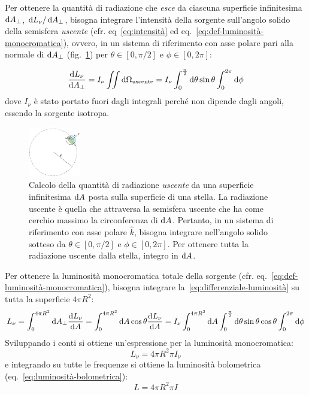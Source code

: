 Per ottenere la quantità di radiazione che \emph{esce} da ciascuna superficie infinitesima $\mathop{\mathrm{{}d}}\mathopen{} A_\perp$, $\mathop{\mathrm{{}d}}\mathopen{} L_\nu / \mathop{\mathrm{{}d}}\mathopen{} A_\perp$, bisogna integrare l'intensità della sorgente sull'angolo solido della semisfera \emph{uscente} (cfr. eq~\eqref{eq:intensità} ed eq.~\eqref{eq:def-luminosità-monocromatica}), ovvero, in un sistema di riferimento con asse polare pari alla normale di $\mathop{\mathrm{{}d}}\mathopen{} A_\perp$ (fig.~\ref{fig:emisfera-uscente}) per $\theta \in [0, \pi/2]$ e $\phi \in [0, 2\pi]$:

\begin{equation}\label{eq:differenziale-luminosità}
    \frac{\mathop{\mathrm{{}d}}\mathopen{} L_\nu}{\mathop{\mathrm{{}d}}\mathopen{} A_\perp} = I_\nu \iint \mathop{\mathrm{{}d}}\mathopen{} \Omega_\textup{uscente} = I_\nu \int_{0}^{\frac{\pi}{2}} \mathop{\mathrm{{}d}}\mathopen{} \theta \sin{\theta} \int_{0}^{2\pi} \mathop{\mathrm{{}d}}\mathopen{} \phi
\end{equation}
dove $I_\nu$ è stato portato fuori dagli integrali perché non dipende dagli angoli, essendo la sorgente isotropa.

\begin{figure}
\centering
\includegraphics[width=0.2\textwidth]{immagini/emisfera-uscente.png}
\caption{Calcolo della quantità di radiazione \emph{uscente} da una superficie infinitesima $\mathop{\mathrm{{}d}}\mathopen{} A$ posta sulla superficie di una stella. La radiazione uscente è quella che attraversa la semisfera uscente che ha come cerchio massimo la circonferenza di $\mathop{\mathrm{{}d}}\mathopen{} A$. Pertanto, in un sistema di riferimento con asse polare $\hat{k}$, bisogna integrare nell'angolo solido sotteso da $\theta \in [0, \pi/2]$ e $\phi \in [0, 2 \pi]$. Per ottenere tutta la radiazione uscente dalla stella, integro in $\mathop{\mathrm{{}d}}\mathopen{} A$.}
\label{fig:emisfera-uscente}
\end{figure}

Per ottenere la luminosità monocromatica totale della sorgente (cfr. eq.~\eqref{eq:def-luminosità-monocromatica}), bisogna integrare la~\eqref{eq:differenziale-luminosità} su tutta la superficie $4\pi R^2$:
\[
    L_\nu = \int_{0}^{4\pi R^2} \mathop{\mathrm{{}d}}\mathopen{} A_\perp \frac{\mathop{\mathrm{{}d}}\mathopen{} L_\nu}{\mathop{\mathrm{{}d}}\mathopen{} A} = \int_{0}^{4\pi R^2} \mathop{\mathrm{{}d}}\mathopen{} A \cos{\theta} \frac{\mathop{\mathrm{{}d}}\mathopen{} L_\nu}{\mathop{\mathrm{{}d}}\mathopen{} A} = I_\nu \int_0^{4\pi R^2} \mathop{\mathrm{{}d}}\mathopen{} A  \int_0^{\frac{\pi}{2}} \mathop{\mathrm{{}d}}\mathopen{} \theta \sin{\theta} \cos{\theta} \int_0^{2\pi} \mathop{\mathrm{{}d}}\mathopen{} \phi
\]
Sviluppando i conti si ottiene un'espressione per la luminosità monocromatica:
\begin{equation}\label{eq:luminosità-monocromatica-intensità}
    L_\nu = 4 \pi R^2 \pi I_\nu
\end{equation}
e integrando su tutte le frequenze si ottiene la luminosità bolometrica (eq.~\eqref{eq:luminosità-bolometrica}):
\begin{equation}\label{eq:luminosità-intensità}
    L = 4 \pi R^2 \pi I
\end{equation}

